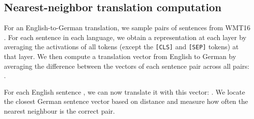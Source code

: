 \documentclass{article} \usepackage{iclr2021_conference,times}
\begin{document}
\subsection{Nearest-neighbor translation computation} \label{app:nn_translation}

For an English-to-German translation, we sample  pairs of sentences from WMT16 \citep{bojar2016results}. For each sentence in each language, we obtain a representation  at each layer  by averaging the activations of all tokens (except the \texttt{[CLS]} and \texttt{[SEP]} tokens) at that layer. We then compute a translation vector from English to German by averaging the difference between the vectors of each sentence pair across all pairs: .







For each English sentence , we can now translate it with this vector: . We locate the closest German sentence vector based on  distance and measure how often the nearest neighbour is the correct pair.
\end{document}
